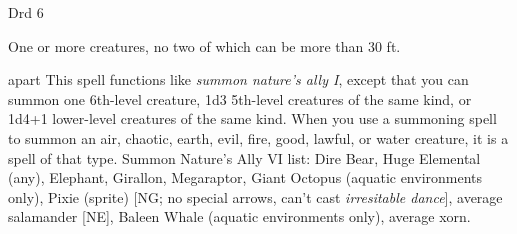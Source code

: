 
\begin{description*}
\item[Level:] Drd 6
\item[Effect:] One or more creatures, no two of which can be more than 30 ft.
\end{description*}

apart
This spell functions like \textit{summon nature's ally I}, except that you can
summon one 6th-level creature, 1d3 5th-level creatures of the same kind, or 1d4+1
lower-level creatures of the same kind.
When you use a summoning spell to summon an air, chaotic, earth, evil, fire, good,
lawful, or water creature, it is a spell of that type.
Summon Nature's Ally VI list: Dire Bear, Huge Elemental (any), Elephant, Girallon, Megaraptor, Giant Octopus (aquatic environments only), Pixie (sprite) [NG; no special arrows, can't cast \textit{irresitable dance}], average salamander [NE], Baleen Whale (aquatic environments only), average xorn.